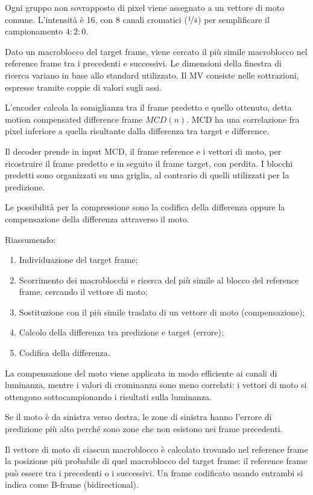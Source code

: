 Ogni gruppo non sovrapposto di pixel viene assegnato a un vettore di moto comune. L'intensità è 16, con 8 canali cromatici ($\nicefrac{1}{4}$) per semplificare il campionamento $4 : 2 : 0$. 

Dato un macroblocco del target frame, viene cercato il più simile macroblocco nel reference frame tra i precedenti e successivi. Le dimensioni della finestra di ricerca variano in base allo standard utilizzato. Il MV consiste nelle sottrazioni, espresse tramite coppie di valori sugli assi.

L'encoder calcola la somiglianza tra il frame predetto e quello ottenuto, detta motion compensated difference frame $MCD(n)$. MCD ha una correlazione fra pixel inferiore a quella risultante dalla differenza tra target e difference.

Il decoder prende in input MCD, il frame reference e i vettori di moto, per ricostruire il frame predetto e in seguito il frame target, con perdita. I blocchi predetti sono organizzati su una griglia, al contrario di quelli utilizzati per la predizione.

Le possibilità per la compressione sono la codifica della differenza oppure la compensazione della differenza attraverso il moto. 

Riassumendo:
\begin{enumerate}
	\item Individuazione del target frame;
	\item Scorrimento dei macroblocchi e ricerca del più simile al blocco del reference frame, cercando il vettore di moto;
	\item Sostituzione con il più simile traslato di un vettore di moto (compensazione);
	\item Calcolo della differenza tra predizione e target (errore);
	\item Codifica della differenza.
\end{enumerate}

La compensazione del moto viene applicata in modo efficiente ai canali di luminanza, mentre i valori di crominanza sono meno correlati: i vettori di moto si ottengono sottocampionando i risultati sulla luminanza.

Se il moto è da sinistra verso destra, le zone di sinistra hanno l'errore di predizione più alto perché sono zone che non esistono nei frame precedenti.

Il vettore di moto di ciascun macroblocco è calcolato trovando nel reference frame la posizione più probabile di quel macroblocco del target frame: il reference frame può essere tra i precedenti o i successivi. Un frame codificato usando entrambi si indica come B-frame (bidirectional).

